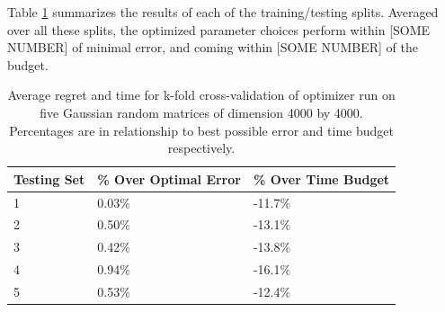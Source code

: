 Table \ref{fig:4kCrossTable} summarizes the results of each of the training/testing splits. Averaged over all these splits, the optimized parameter choices perform within [SOME NUMBER] of minimal error, and coming within [SOME NUMBER] of the budget.

\begin{table}
\label{fig:4kCrossTable}
\begin{center}
    \begin{tabular}{| p{2.2cm} | p{2.2cm} | p{2.2cm} |}
    \hline
    Testing Set & \% Over Optimal Error & \% Over Time Budget \\ \hline
    1 & 0.03\% & -11.7\% \\ \hline
    2 & 0.50\% & -13.1\% \\ \hline
    3 & 0.42\% & -13.8\% \\ \hline
    4 & 0.94\% & -16.1\% \\ \hline
    5 & 0.53\% & -12.4\% \\ \hline
    \end{tabular}
\end{center}
\caption{Average regret and time for k-fold cross-validation of optimizer run on five Gaussian random matrices of dimension 4000 by 4000. Percentages are in relationship to best possible error and time budget respectively.}
\end{table}

